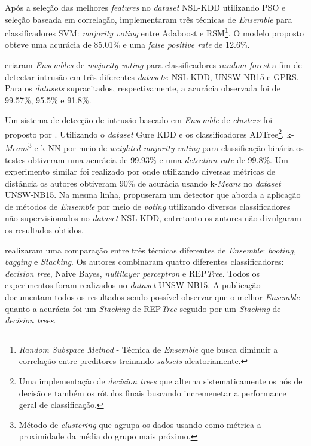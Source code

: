 Após a seleção das melhores \textit{features} no \textit{dataset} NSL-KDD utilizando PSO e seleção baseada em correlação,  implementaram três técnicas de \textit{Ensemble} para classificadores SVM: \textit{majority voting} entre Adaboost e RSM\footnote{\textit{Random Subspace Method} - Técnica de \textit{Ensemble} que busca diminuir a correlação entre preditores treinando \textit{subsets} aleatoriamente.}. O modelo proposto obteve uma acurácia de 85.01\% e uma \textit{false positive rate} de 12.6\%.
 

 criaram \textit{Ensembles} de \textit{majority voting} para classificadores \textit{random forest} a fim de detectar intrusão em três diferentes \textit{datasets}: NSL-KDD, UNSW-NB15 e GPRS. Para os \textit{datasets} supracitados, respectivamente, a acurácia observada foi de 99.57\%, 95.5\% e 91.8\%.

Um sistema de detecção de intrusão baseado em \textit{Ensemble} de \textit{clusters} foi proposto por . Utilizando o \textit{dataset} Gure KDD e os classificadores ADTree\footnote{Uma implementação de \textit{decision trees} que alterna sistematicamente os nós de decisão e também os rótulos finais buscando incremenetar a performance geral de classificação.}, k-\textit{Means}\footnote{Método de \textit{clustering} que agrupa os dados usando como métrica a proximidade da média do grupo mais próximo.} e k-NN por meio de \textit{weighted majority voting} para classificação binária os testes obtiveram uma acurácia de 99.93\% e uma \textit{detection rate} de 99.8\%. Um experimento similar foi realizado por  onde utilizando diversas métricas de distância os autores obtiveram 90\% de acurácia usando k-\textit{Means} no \textit{dataset} UNSW-NB15. Na mesma linha,  propuseram um detector que aborda a aplicação de métodos de \textit{Ensemble} por meio de \textit{voting} utilizando diversos classificadores não-supervisionados no \textit{dataset} NSL-KDD, entretanto os autores não divulgaram os resultados obtidos.

 realizaram uma comparação entre três técnicas diferentes de \textit{Ensemble}: \textit{booting, bagging} e \textit{Stacking}. Os autores combinaram quatro diferentes classificadores: \textit{decision tree}, Naive Bayes, \textit{nultilayer perceptron} e REP\textit{Tree}. Todos os experimentos foram realizados no \textit{dataset} UNSW-NB15. A publicação documentam todos os resultados sendo possível observar que o melhor \textit{Ensemble} quanto a acurácia foi um \textit{Stacking} de REP\textit{Tree} seguido por um \textit{Stacking} de \textit{decision trees}.



